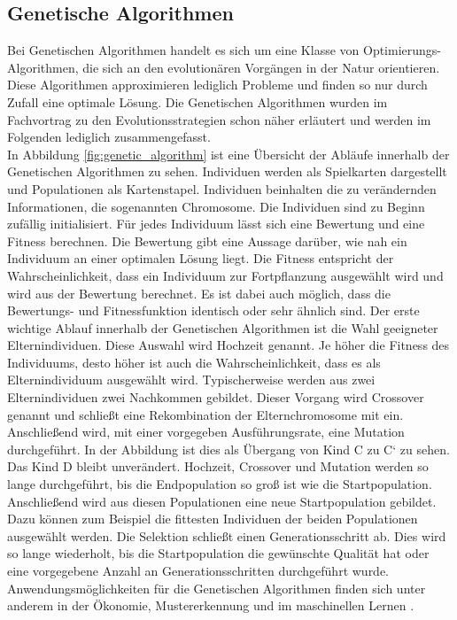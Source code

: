 \subsection{Genetische Algorithmen}
Bei Genetischen Algorithmen \cite[S. 130-132]{tsp} handelt es sich um eine Klasse von Optimierungs-Algorithmen, die sich an den evolutionären Vorgängen in der Natur orientieren. Diese Algorithmen approximieren lediglich Probleme und finden so nur durch Zufall eine optimale Lösung.
Die Genetischen Algorithmen wurden im Fachvortrag zu den Evolutionsstrategien schon näher erläutert und werden im Folgenden lediglich zusammengefasst.\\
In Abbildung \ref{fig:genetic_algorithm} ist eine Übersicht der Abläufe innerhalb der Genetischen Algorithmen zu sehen. Individuen werden als Spielkarten dargestellt und Populationen als Kartenstapel. Individuen beinhalten die zu verändernden Informationen, die sogenannten Chromosome. Die Individuen sind zu Beginn zufällig initialisiert.
Für jedes Individuum lässt sich eine Bewertung und eine Fitness berechnen. Die Bewertung gibt eine Aussage darüber, wie nah ein Individuum an einer optimalen Lösung liegt.
Die Fitness entspricht der Wahrscheinlichkeit, dass ein Individuum zur Fortpflanzung ausgewählt wird und wird aus der Bewertung berechnet. Es ist dabei auch möglich, dass die Bewertungs- und Fitnessfunktion identisch oder sehr ähnlich sind.
Der erste wichtige Ablauf innerhalb der Genetischen Algorithmen ist die Wahl geeigneter Elternindividuen. Diese Auswahl wird Hochzeit genannt. Je höher die Fitness des Individuums, desto höher ist auch die Wahrscheinlichkeit, dass es als Elternindividuum ausgewählt wird.
Typischerweise werden aus zwei Elternindividuen zwei Nachkommen gebildet. Dieser Vorgang wird Crossover genannt und schließt eine Rekombination der Elternchromosome mit ein. Anschließend wird, mit einer vorgegeben Ausführungsrate, eine Mutation durchgeführt. In der Abbildung ist dies als Übergang von Kind C zu C` zu sehen. Das Kind D bleibt unverändert.
Hochzeit, Crossover und Mutation werden so lange durchgeführt, bis die Endpopulation so groß ist wie die Startpopulation. Anschließend wird aus diesen Populationen eine neue Startpopulation gebildet. Dazu können zum Beispiel die fittesten Individuen der beiden Populationen ausgewählt werden.
Die Selektion schließt einen Generationsschritt ab. Dies wird so lange wiederholt, bis die Startpopulation die gewünschte Qualität hat oder eine vorgegebene Anzahl an Generationsschritten durchgeführt wurde.
Anwendungsmöglichkeiten für die Genetischen Algorithmen finden sich unter anderem in der Ökonomie, Mustererkennung und im maschinellen Lernen \cite[S. 185-186]{schoeneburg}.


